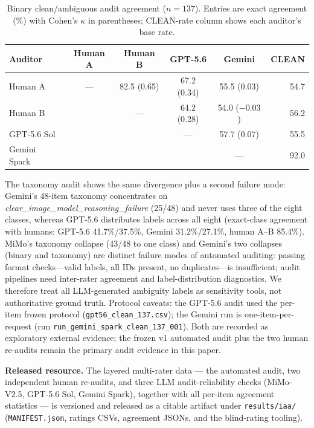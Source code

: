 \begin{table}[h]
\centering
\footnotesize
\setlength{\tabcolsep}{4pt}
\caption{Binary clean/ambiguous audit agreement ($n{=}137$). Entries are
exact agreement (\%) with Cohen's $\kappa$ in parentheses; CLEAN-rate column
shows each auditor's base rate.}
\label{tab:auditor-matrix}
\begin{tabular}{lccccr}
\toprule
Auditor & Human A & Human B & GPT-5.6 & Gemini & CLEAN \\
\midrule
Human A & --- & 82.5 (0.65) & 67.2 (0.34) & 55.5 (0.03) & 54.7 \\
Human B & & --- & 64.2 (0.28) & 54.0 ($-0.03$) & 56.2 \\
GPT-5.6 Sol & & & --- & 57.7 (0.07) & 55.5 \\
Gemini Spark & & & & --- & 92.0 \\
\bottomrule
\end{tabular}
\end{table}

The taxonomy audit shows the same divergence plus a second failure mode:
Gemini's 48-item taxonomy concentrates on
\emph{clear\_image\_model\_reasoning\_failure} (25/48) and never uses three of
the eight classes, whereas GPT-5.6 distributes labels across all eight
(exact-class agreement with humans: GPT-5.6 41.7\%/37.5\%, Gemini
31.2\%/27.1\%, human A--B 85.4\%). MiMo's taxonomy collapse (43/48 to one
class) and Gemini's two collapses (binary and taxonomy) are distinct
failure modes of automated auditing: passing format checks---valid labels,
all IDs present, no duplicates---is insufficient; audit pipelines need
inter-rater agreement and label-distribution diagnostics. We therefore treat
all LLM-generated ambiguity labels as sensitivity tools, not authoritative
ground truth. Protocol caveats: the GPT-5.6 audit used the per-item frozen
protocol (\texttt{gpt56\_clean\_137.csv}); the Gemini run is
one-item-per-request (run \texttt{run\_gemini\_spark\_clean\_137\_001}). Both
are recorded as exploratory external evidence; the frozen v1 automated audit
plus the two human re-audits remain the primary audit evidence in this paper.

\textbf{Released resource.} The layered multi-rater data --- the automated
audit, two independent human re-audits, and three LLM audit-reliability
checks (MiMo-V2.5, GPT-5.6 Sol, Gemini Spark), together with all per-item
agreement statistics --- is versioned and released as a citable artifact
under \texttt{results/iaa/} (\texttt{MANIFEST.json}, ratings CSVs, agreement
JSONs, and the blind-rating tooling).

